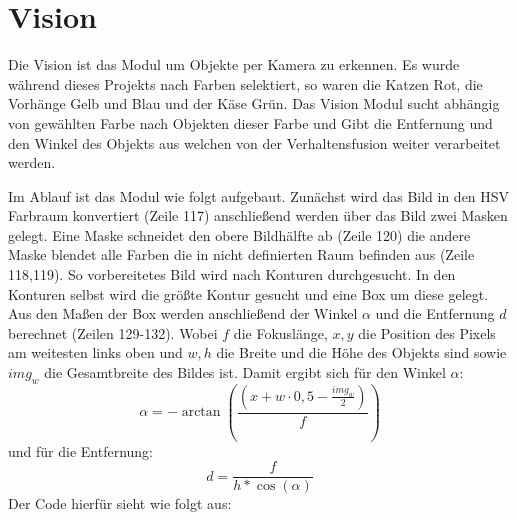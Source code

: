 \documentclass[11pt,a4paper]{article}
\begin{document}
\section{Vision}      
Die Vision ist das Modul um Objekte per Kamera zu erkennen. Es wurde während dieses Projekts nach Farben selektiert, so waren die Katzen Rot, die Vorhänge Gelb und Blau und der Käse Grün. Das Vision Modul sucht abhängig von gewählten Farbe nach Objekten dieser Farbe und Gibt die Entfernung und den Winkel des Objekts aus welchen von der Verhaltensfusion weiter verarbeitet werden.

 Im Ablauf ist das Modul wie folgt aufgebaut. Zunächst wird das Bild in den HSV Farbraum konvertiert (Zeile 117) anschließend werden über das Bild zwei Masken gelegt. Eine Maske schneidet den obere Bildhälfte ab (Zeile 120) die andere Maske blendet alle Farben die in nicht definierten Raum befinden aus (Zeile 118,119). So vorbereitetes Bild wird nach Konturen durchgesucht. In den Konturen selbst wird die größte Kontur gesucht und eine Box um diese gelegt. Aus den Maßen der Box werden anschließend der Winkel $\alpha$ und die Entfernung $d$ berechnet (Zeilen 129-132). Wobei $f$ die Fokuslänge, $x,y$ die Position des Pixels am weitesten links oben und $w,h$ die Breite und die Höhe des Objekts sind sowie $img_w$ die Gesamtbreite des Bildes ist. Damit ergibt sich für den Winkel $\alpha$:
\begin{equation}
\alpha = -\arctan(\frac{(x+w\cdot 0,5-\frac{img_w}{2})}{f})
\end{equation}   
und für die Entfernung:
\begin{equation}
d=\frac{f}{h*\cos(\alpha)}
\end{equation}
Der Code hierfür sieht wie folgt aus:
\end{document}
